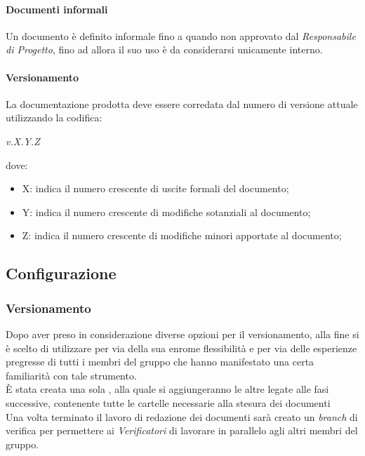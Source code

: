       \paragraph{Documenti informali}
        Un documento è definito informale fino a quando non approvato dal \emph{Responsabile di Progetto}, fino ad allora il suo uso è da considerarsi unicamente interno.
      \paragraph{Versionamento}
        La documentazione prodotta deve essere corredata dal numero di versione attuale utilizzando la codifica:
        \begin{center}
          \emph{v.X.Y.Z}
        \end{center}
        dove:
        \begin{itemize}
          \item X: indica il numero crescente di uscite formali del documento;
          \item Y: indica il numero crescente di modifiche sotanziali al documento;
          \item Z: indica il numero crescente di modifiche minori apportate al documento;
        \end{itemize}


       
    
    \subsection{Configurazione}
      
    \subsubsection{Versionamento}
      Dopo aver preso in considerazione diverse opzioni per il versionamento, alla fine si è scelto di utilizzare \textbf{} per via della
      sua enrome flessibilità e per via delle esperienze pregresse di tutti i membri del gruppo che hanno manifestato una certa familiarità con
      tale strumento.\\
      È stata creata una sola , alla quale si aggiungeranno le altre legate alle fasi successive, contenente tutte le cartelle necessarie
      alla stesura dei documenti \glossaryItem{\LaTeX}\.\\
      Una volta terminato il lavoro di redazione dei documenti sarà creato un \emph{branch} di verifica per permettere ai \emph{Verificatori} di
      lavorare in parallelo agli altri membri del gruppo.
      
